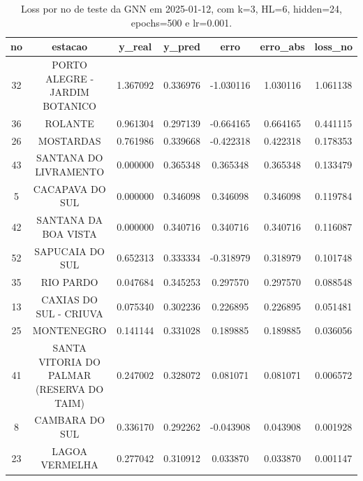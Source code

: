 \begin{table}[h]
\centering
\caption{Loss por no de teste da GNN em 2025-01-12, com k=3, HL=6, hidden=24, epochs=500 e lr=0.001.}
\label{tab:gnn_loss_k3_hl6_h24_e500_d20250112}
\begin{tabular}{ccccccc}
\toprule
no & estacao & y\_real & y\_pred & erro & erro\_abs & loss\_no \\
\midrule
32 & PORTO ALEGRE - JARDIM BOTANICO & 1.367092 & 0.336976 & -1.030116 & 1.030116 & 1.061138 \\
36 & ROLANTE & 0.961304 & 0.297139 & -0.664165 & 0.664165 & 0.441115 \\
26 & MOSTARDAS & 0.761986 & 0.339668 & -0.422318 & 0.422318 & 0.178353 \\
43 & SANTANA DO LIVRAMENTO & 0.000000 & 0.365348 & 0.365348 & 0.365348 & 0.133479 \\
5 & CACAPAVA DO SUL & 0.000000 & 0.346098 & 0.346098 & 0.346098 & 0.119784 \\
42 & SANTANA DA BOA VISTA & 0.000000 & 0.340716 & 0.340716 & 0.340716 & 0.116087 \\
52 & SAPUCAIA DO SUL & 0.652313 & 0.333334 & -0.318979 & 0.318979 & 0.101748 \\
35 & RIO PARDO & 0.047684 & 0.345253 & 0.297570 & 0.297570 & 0.088548 \\
13 & CAXIAS DO SUL - CRIUVA & 0.075340 & 0.302236 & 0.226895 & 0.226895 & 0.051481 \\
25 & MONTENEGRO & 0.141144 & 0.331028 & 0.189885 & 0.189885 & 0.036056 \\
41 & SANTA VITORIA DO PALMAR (RESERVA DO TAIM) & 0.247002 & 0.328072 & 0.081071 & 0.081071 & 0.006572 \\
8 & CAMBARA DO SUL & 0.336170 & 0.292262 & -0.043908 & 0.043908 & 0.001928 \\
23 & LAGOA VERMELHA & 0.277042 & 0.310912 & 0.033870 & 0.033870 & 0.001147 \\
\bottomrule
\end{tabular}
\end{table}
